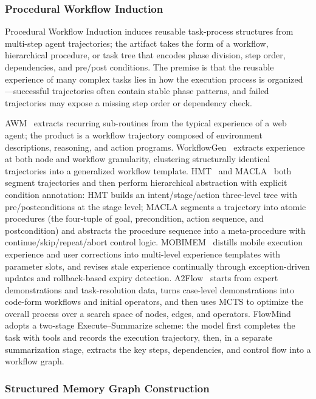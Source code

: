 \subsubsection{Procedural Workflow Induction}

Procedural Workflow Induction induces reusable task-process structures from multi-step agent trajectories; the artifact takes the form of a workflow, hierarchical procedure, or task tree that encodes phase division, step order, dependencies, and pre/post conditions. The premise is that the reusable experience of many complex tasks lies in how the execution process is organized---successful trajectories often contain stable phase patterns, and failed trajectories may expose a missing step order or dependency check.

AWM~\cite{Wan24} extracts recurring sub-routines from the typical experience of a web agent; the product is a workflow trajectory composed of environment descriptions, reasoning, and action programs. WorkflowGen~\cite{Wei26} extracts experience at both node and workflow granularity, clustering structurally identical trajectories into a generalized workflow template. HMT~\cite{Tan26} and MACLA~\cite{For25} both segment trajectories and then perform hierarchical abstraction with explicit condition annotation: HMT builds an intent/stage/action three-level tree with pre/postconditions at the stage level; MACLA segments a trajectory into atomic procedures (the four-tuple of goal, precondition, action sequence, and postcondition) and abstracts the procedure sequence into a meta-procedure with continue/skip/repeat/abort control logic. MOBIMEM~\cite{Liu25i} distills mobile execution experience and user corrections into multi-level experience templates with parameter slots, and revises stale experience continually through exception-driven updates and rollback-based expiry detection. A2Flow~\cite{Zha25c} starts from expert demonstrations and task-resolution data, turns case-level demonstrations into code-form workflows and initial operators, and then uses MCTS to optimize the overall process over a search space of nodes, edges, and operators. FlowMind~\cite{Liu26} adopts a two-stage Execute--Summarize scheme: the model first completes the task with tools and records the execution trajectory, then, in a separate summarization stage, extracts the key steps, dependencies, and control flow into a workflow graph.

\subsubsection{Structured Memory Graph Construction}

